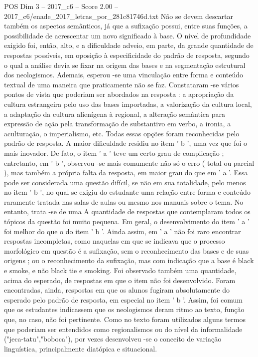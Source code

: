 \begin{textsample}{POS Dim 3 – 2017\_c6 – Score 2.00 – 2017\_c6/enade\_2017\_letras\_por\_281c81746d.txt}
Não se devem descartar também os aspectos semânticos, já que a sufixação possui, entre suas funções, a possibilidade de acrescentar um novo significado à base.
O nível de profundidade exigido foi, então, alto, e a dificuldade adveio, em parte, da grande quantidade de respostas possíveis, em oposição à especificidade do padrão de resposta, segundo o qual a análise devia se fixar na origem das bases e na segmentação estrutural dos neologismos.
Ademais, esperou -se uma vinculação entre forma e conteúdo textual de uma maneira que praticamente não se faz.
Constataram -se vários pontos de vista que poderiam ser abordados na resposta : a apropriação da cultura estrangeira pelo uso das bases importadas, a valorização da cultura local, a adaptação da cultura alienígena à regional, a alteração semântica para expressão de ação pela transformação de substantivo em verbo, a ironia, a aculturação, o imperialismo, etc.
Todas essas opções foram reconhecidas pelo padrão de resposta.
A maior dificuldade residiu no item ' b ', uma vez que foi o mais inovador.
De fato, o item ' a ' teve um certo grau de complicação ; entretanto, em ' b ', observou -se mais comumente não só o erro ( total ou parcial ), mas também a própria falta da resposta, em maior grau do que em ' a '.
Essa pode ser considerada uma questão difícil, se não em sua totalidade, pelo menos no item ' b ', no qual se exigiu do estudante uma relação entre forma e conteúdo raramente tratada nas salas de aulas ou mesmo nos manuais sobre o tema.
No entanto, trata -se de uma A quantidade de respostas que contemplaram todos os tópicos da questão foi muito pequena.
Em geral, o desenvolvimento do item ' a ' foi melhor do que o do item ' b '.
Ainda assim, em ' a ' não foi raro encontrar respostas incompletas, como naquelas em que se indicava que o processo morfológico em questão é a sufixação, sem o reconhecimento das bases e de suas origens ; ou o reconhecimento da sufixação, mas com indicação que a base é black e smoke, e não black tie e smoking.
Foi observado também uma quantidade, acima do esperado, de respostas em que o item não foi desenvolvido.
Foram encontradas, ainda, respostas em que os alunos fugiram absolutamente do esperado pelo padrão de resposta, em especial no item ' b '.
Assim, foi comum que os estudantes indicassem que os neologismos deram ritmo ao texto, função que, no caso, não foi pertinente.
Como no texto foram utilizados alguns termos que poderiam ser entendidos como regionalismos ou do nível da informalidade ("jeca-tatu","boboca"), por vezes desenvolveu -se o conceito de variação linguística, principalmente diatópica e situacional.

\end{textsample}
